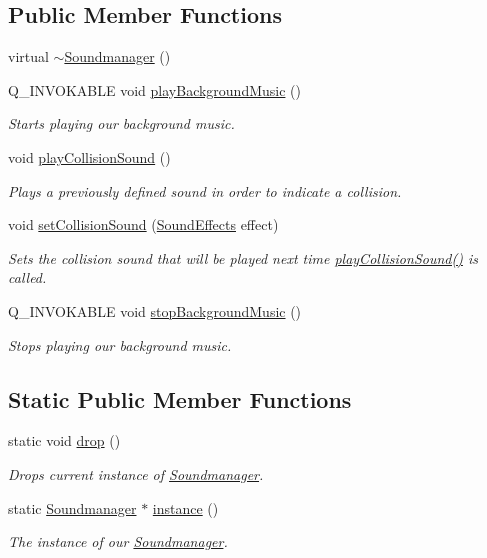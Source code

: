 \subsection*{Public Member Functions}
\begin{DoxyCompactItemize}
\item 
virtual \hyperlink{class_soundmanager_a098a604a4cb0a238863ddb0065f11885}{$\sim$\+Soundmanager} ()
\item 
Q\+\_\+\+I\+N\+V\+O\+K\+A\+B\+L\+E void \hyperlink{class_soundmanager_adc77c21e0705c9220b6bfff6d8957d7c}{play\+Background\+Music} ()
\begin{DoxyCompactList}\small\item\em Starts playing our background music. \end{DoxyCompactList}\item 
void \hyperlink{class_soundmanager_a6116af7088ee72cafda5d3e1c6b6600b}{play\+Collision\+Sound} ()
\begin{DoxyCompactList}\small\item\em Plays a previously defined sound in order to indicate a collision. \end{DoxyCompactList}\item 
void \hyperlink{class_soundmanager_a490ddb5b63b94701ad5d246d27759b14}{set\+Collision\+Sound} (\hyperlink{soundmanager_8h_a7fbdfef23a43c911ebc18ef1b9d9808d}{Sound\+Effects} effect)
\begin{DoxyCompactList}\small\item\em Sets the collision sound that will be played next time \hyperlink{class_soundmanager_a6116af7088ee72cafda5d3e1c6b6600b}{play\+Collision\+Sound()} is called. \end{DoxyCompactList}\item 
Q\+\_\+\+I\+N\+V\+O\+K\+A\+B\+L\+E void \hyperlink{class_soundmanager_a36411846ae8c5cd18239cfb913f3dc83}{stop\+Background\+Music} ()
\begin{DoxyCompactList}\small\item\em Stops playing our background music. \end{DoxyCompactList}\end{DoxyCompactItemize}
\subsection*{Static Public Member Functions}
\begin{DoxyCompactItemize}
\item 
static void \hyperlink{class_soundmanager_aa4a2f89d1c517bff42654038da492d65}{drop} ()
\begin{DoxyCompactList}\small\item\em Drops current instance of \hyperlink{class_soundmanager}{Soundmanager}. \end{DoxyCompactList}\item 
static \hyperlink{class_soundmanager}{Soundmanager} $\ast$ \hyperlink{class_soundmanager_aa1fa87053cd1cd240447a54327962b23}{instance} ()
\begin{DoxyCompactList}\small\item\em The instance of our \hyperlink{class_soundmanager}{Soundmanager}. \end{DoxyCompactList}\end{DoxyCompactItemize}
